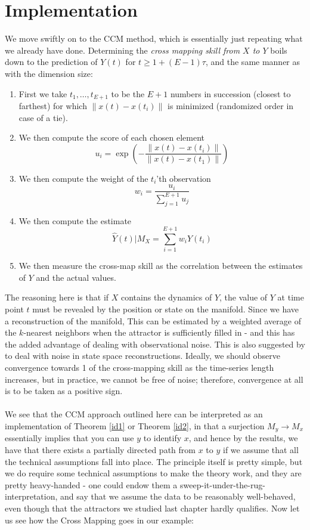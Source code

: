 \documentclass[11pt, a4paper]{memoir}
\theoremstyle{break}
\theoremstyle{break}
\theoremstyle{nonumberplain}
\newcommand{\norm}[1]{\left\lVert#1\right\rVert}
\begin{document}
\section{Implementation}
We move swiftly on to the CCM method, which is essentially just repeating what we already have done. Determining the \emph{cross mapping skill from $X$ to $Y$} boils down to the prediction of $Y(t)$ for $t\geqslant 1+(E-1)\tau$, and the same manner as with the dimension size:
\begin{enumerate}[label=(\roman*)]
	\item First we take $t_1,\ldots,t_{E+1}$ to be the $E+1$ numbers in succession (closest to farthest) for which $\norm{x(t)-x(t_{i})}$ is minimized (randomized order in case of a tie).
	\item We then compute the score of each chosen element
	$$u_i=\exp\left(-\frac{\norm{x(t)-x(t_i)}}{\norm{x(t)-x(t_1)}}\right)$$
	\item We then compute the weight of the $t_i$'th observation
	$$w_i=\frac{u_i}{\sum_{j=1}^{E+1} u_j}$$
	\item We then compute the estimate
	$$\hat{Y}(t)|M_X=\sum_{i=1}^{E+1} w_i Y(t_i)$$
	\item We then measure the cross-map skill as the correlation between the estimates of $Y$ and the actual values.
\end{enumerate}
The reasoning here is that if $X$ contains the dynamics of $Y$, the value of $Y$ at time point $t$ must be revealed by the position or state on the manifold. Since we have a reconstruction of the manifold, This can be estimated by a weighted average of the $k$-nearest neighbors when the attractor is sufficiently filled in - and this has the added advantage of dealing with observational noise. This is also suggested by \cite{Casdagli} to deal with noise in state space reconstructions. Ideally, we should observe convergence towards 1 of the cross-mapping skill as the time-series length increases, but in practice, we cannot be free of noise; therefore, convergence at all is to be taken as a positive sign.\\\\
We see that the CCM approach outlined here can be interpreted as an implementation of Theorem \ref{id1} or Theorem \ref{id2}, in that a surjection $M_y\to M_x$ essentially implies that you can use $y$ to identify $x$, and hence by the results, we have that there exists a partially directed path from $x$ to $y$ if we assume that all the technical assumptions fall into place.
The principle itself is pretty simple, but we do require some technical assumptions to make the theory work, and they are pretty heavy-handed - one could endow them a sweep-it-under-the-rug-interpretation, and say that we assume the data to be reasonably well-behaved, even though that the attractors we studied last chapter hardly qualifies. Now let us see how the Cross Mapping goes in our example:
\end{document}
